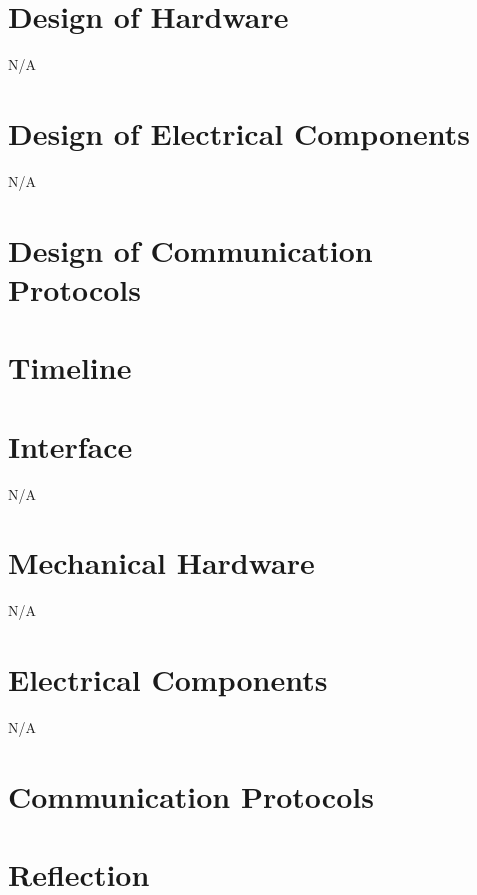 \documentclass[12pt, titlepage]{article}
\begin{document}
\section{Design of Hardware}

N/A

\section{Design of Electrical Components}

N/A

\section{Design of Communication Protocols}

\section{Timeline}


% 

\newpage{}

\appendix

\section{Interface} 

N/A 

\section{Mechanical Hardware}

N/A

\section{Electrical Components}

N/A

\section{Communication Protocols}

\section{Reflection}
\end{document}
